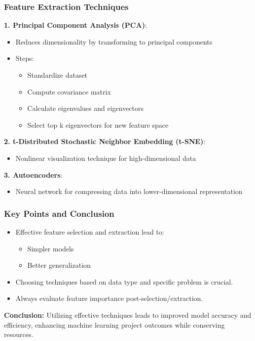 \documentclass[aspectratio=169]{beamer}
\begin{document}
\begin{frame}[fragile]
    \frametitle{Feature Extraction Techniques}
    \textbf{1. Principal Component Analysis (PCA)}:
    \begin{itemize}
        \item Reduces dimensionality by transforming to principal components
        \item Steps:
        \begin{itemize}
            \item Standardize dataset
            \item Compute covariance matrix
            \item Calculate eigenvalues and eigenvectors
            \item Select top k eigenvectors for new feature space
        \end{itemize}
    \end{itemize}

    \textbf{2. t-Distributed Stochastic Neighbor Embedding (t-SNE)}:
    \begin{itemize}
        \item Nonlinear visualization technique for high-dimensional data
    \end{itemize}

    \textbf{3. Autoencoders}:
    \begin{itemize}
        \item Neural network for compressing data into lower-dimensional representation
    \end{itemize}
\end{frame}

\begin{frame}[fragile]
    \frametitle{Key Points and Conclusion}
    \begin{itemize}
        \item Effective feature selection and extraction lead to:
        \begin{itemize}
            \item Simpler models
            \item Better generalization
        \end{itemize}
        \item Choosing techniques based on data type and specific problem is crucial.
        \item Always evaluate feature importance post-selection/extraction.
    \end{itemize}

    \textbf{Conclusion:} Utilizing effective techniques leads to improved model accuracy and efficiency, enhancing machine learning project outcomes while conserving resources.
\end{frame}
\end{document}
